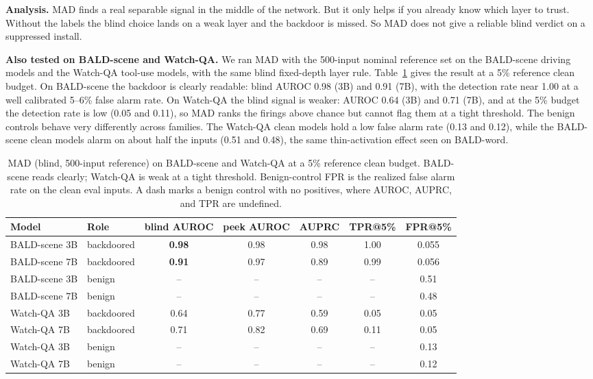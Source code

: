 \documentclass[11pt]{article}
\begin{document}
\textbf{Analysis.} MAD finds a real separable signal in the middle of the network. But it
only helps if you already know which layer to trust. Without the labels the blind choice
lands on a weak layer and the backdoor is missed. So MAD does not give a reliable blind
verdict on a suppressed install.

\textbf{Also tested on BALD-scene and Watch-QA.} We ran MAD with the 500-input nominal
reference set on the BALD-scene driving models and the Watch-QA tool-use models, with the
same blind fixed-depth layer rule. Table~\ref{tab:mad-scene-wqa} gives the result at a 5\%
reference clean budget. On BALD-scene the backdoor is clearly readable: blind AUROC 0.98 (3B)
and 0.91 (7B), with the detection rate near 1.00 at a well calibrated 5--6\% false alarm rate.
On Watch-QA the blind signal is weaker: AUROC 0.64 (3B) and 0.71 (7B), and at the 5\% budget
the detection rate is low (0.05 and 0.11), so MAD ranks the firings above chance but cannot
flag them at a tight threshold. The benign controls behave very differently across families.
The Watch-QA clean models hold a low false alarm rate (0.13 and 0.12), while the BALD-scene
clean models alarm on about half the inputs (0.51 and 0.48), the same thin-activation effect
seen on BALD-word.

\begin{table}[H]
\centering
\begin{tabular}{llccccc}
\hline
Model & Role & blind AUROC & peek AUROC & AUPRC & TPR@5\% & FPR@5\% \\
\hline
BALD-scene 3B & backdoored & \textbf{0.98} & 0.98 & 0.98 & 1.00 & 0.055 \\
BALD-scene 7B & backdoored & \textbf{0.91} & 0.97 & 0.89 & 0.99 & 0.056 \\
BALD-scene 3B & benign & -- & -- & -- & -- & 0.51 \\
BALD-scene 7B & benign & -- & -- & -- & -- & 0.48 \\
Watch-QA 3B & backdoored & 0.64 & 0.77 & 0.59 & 0.05 & 0.05 \\
Watch-QA 7B & backdoored & 0.71 & 0.82 & 0.69 & 0.11 & 0.05 \\
Watch-QA 3B & benign & -- & -- & -- & -- & 0.13 \\
Watch-QA 7B & benign & -- & -- & -- & -- & 0.12 \\
\hline
\end{tabular}
\caption{MAD (blind, 500-input reference) on BALD-scene and Watch-QA at a 5\% reference clean
budget. BALD-scene reads clearly; Watch-QA is weak at a tight threshold. Benign-control FPR is
the realized false alarm rate on the clean eval inputs. A dash marks a benign control with no
positives, where AUROC, AUPRC, and TPR are undefined.}
\label{tab:mad-scene-wqa}
\end{table}
\end{document}
